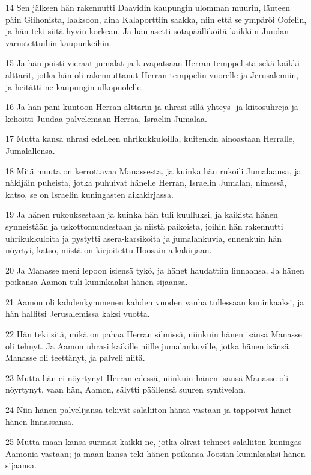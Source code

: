 \par 14 Sen jälkeen hän rakennutti Daavidin kaupungin ulomman muurin, länteen päin Giihonista, laaksoon, aina Kalaporttiin saakka, niin että se ympäröi Oofelin, ja hän teki siitä hyvin korkean. Ja hän asetti sotapäälliköitä kaikkiin Juudan varustettuihin kaupunkeihin.
\par 15 Ja hän poisti vieraat jumalat ja kuvapatsaan Herran temppelistä sekä kaikki alttarit, jotka hän oli rakennuttanut Herran temppelin vuorelle ja Jerusalemiin, ja heitätti ne kaupungin ulkopuolelle.
\par 16 Ja hän pani kuntoon Herran alttarin ja uhrasi sillä yhteys- ja kiitosuhreja ja kehoitti Juudaa palvelemaan Herraa, Israelin Jumalaa.
\par 17 Mutta kansa uhrasi edelleen uhrikukkuloilla, kuitenkin ainoastaan Herralle, Jumalallensa.
\par 18 Mitä muuta on kerrottavaa Manassesta, ja kuinka hän rukoili Jumalaansa, ja näkijäin puheista, jotka puhuivat hänelle Herran, Israelin Jumalan, nimessä, katso, se on Israelin kuningasten aikakirjassa.
\par 19 Ja hänen rukouksestaan ja kuinka hän tuli kuulluksi, ja kaikista hänen synneistään ja uskottomuudestaan ja niistä paikoista, joihin hän rakennutti uhrikukkuloita ja pystytti asera-karsikoita ja jumalankuvia, ennenkuin hän nöyrtyi, katso, niistä on kirjoitettu Hoosain aikakirjaan.
\par 20 Ja Manasse meni lepoon isiensä tykö, ja hänet haudattiin linnaansa. Ja hänen poikansa Aamon tuli kuninkaaksi hänen sijaansa.
\par 21 Aamon oli kahdenkymmenen kahden vuoden vanha tullessaan kuninkaaksi, ja hän hallitsi Jerusalemissa kaksi vuotta.
\par 22 Hän teki sitä, mikä on pahaa Herran silmissä, niinkuin hänen isänsä Manasse oli tehnyt. Ja Aamon uhrasi kaikille niille jumalankuville, jotka hänen isänsä Manasse oli teettänyt, ja palveli niitä.
\par 23 Mutta hän ei nöyrtynyt Herran edessä, niinkuin hänen isänsä Manasse oli nöyrtynyt, vaan hän, Aamon, sälytti päällensä suuren syntivelan.
\par 24 Niin hänen palvelijansa tekivät salaliiton häntä vastaan ja tappoivat hänet hänen linnassansa.
\par 25 Mutta maan kansa surmasi kaikki ne, jotka olivat tehneet salaliiton kuningas Aamonia vastaan; ja maan kansa teki hänen poikansa Joosian kuninkaaksi hänen sijaansa.

